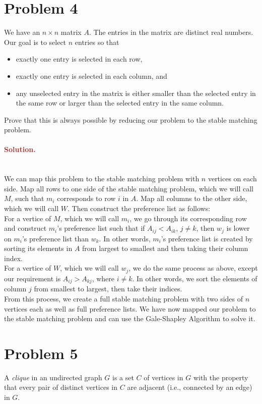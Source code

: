 \section*{Problem 4}
We have an $n \times n$ matrix $A$. The entries in the matrix are distinct real numbers. Our goal is to select $n$ entries so that
\begin{itemize}
    \item exactly one entry is selected in each row,
    \item exactly one entry is selected in each column, and
    \item any unselected entry in the matrix is either smaller than the selected entry in the same row or larger than the selected entry in the same column.
\end{itemize}
Prove that this is always possible by reducing our problem to the stable matching problem.

\paragraph{\textcolor{brown}{Solution.}} \: \\
We can map this problem to the stable matching problem with $n$ vertices on each side. Map all rows to one side of the stable matching problem, which we will call $M$, such that $m_i$ corresponds to row $i$ in $A$. Map all columns to the other side, which we will call $W$. Then construct the preference list as follows:
\\For a vertice of $M$, which we will call $m_i$, we go through its corresponding row and construct $m_i$'s preference list such that if $A_{ij} < A_{ik}$, $j \neq k$, then $w_j$ is lower on $m_i$'s preference list than $w_k$. In other words, $m_i$'s preference list is created by sorting its elements in $A$ from largest to smallest and then taking their column index.
\\For a vertice of $W$, which we will call $w_j$, we do the same process as above, except our requirement is $A_{ij} > A_{kj}$, where $i \neq k$. In other words, we sort the elements of column $j$ from smallest to largest, then take their indices.
\\From this process, we create a full stable matching problem with two sides of $n$ vertices each as well as full preference lists. We have now mapped our problem to the stable matching problem and can use the Gale-Shapley Algorithm to solve it.

\section*{Problem 5}
A \emph{clique} in an undirected graph $G$ is a set $C$ of vertices in $G$ with the property that every pair of distinct vertices in $C$ are adjacent (i.e., connected by an edge) in $G$.

